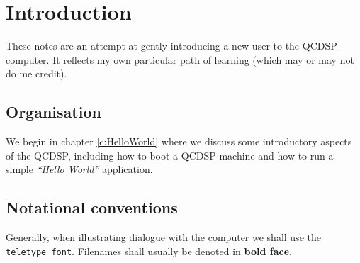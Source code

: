 \chapter{Introduction}
These notes are an attempt at gently introducing a new
user to the QCDSP computer. It reflects my own particular
path of learning (which may or may not do me credit). 

\section{Organisation}
We begin in chapter \ref{c:HelloWorld} where we discuss
some introductory aspects of the QCDSP, including how 
to boot a QCDSP machine and how to run a simple 
{\em``Hello World''} application.

\section{Notational conventions}
Generally, when illustrating dialogue with the computer
we shall use the {\tt teletype font}. Filenames shall usually
be denoted in {\bf bold face}.

